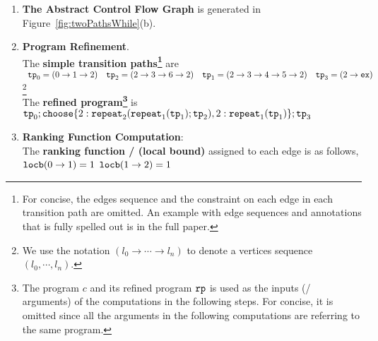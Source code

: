 \begin{enumerate}
  \item  \textbf{The Abstract Control Flow Graph} is generated in Figure~\ref{fig:twoPathsWhile}(b).

  \item \textbf{Program Refinement}. 
  \\
  The \textbf{simple transition paths\footnote{For concise, the edges sequence and the constraint on each edge in
  each transition path are omitted.
  An example with edge sequences and annotations that is fully spelled out is in the full paper.}} are
  \\
$
\begin{array}{llll}
  \mathtt{tp}_0 = (0 \to 1 \to 2)
  &
  \mathtt{tp}_2 = (2 \to 3 \to 6 \to 2)
  &
  \mathtt{tp}_1 = (2 \to 3 \to 4 \to 5 \to 2)
  &
  \mathtt{tp}_3 = (2 \to \mathtt{ex})
  \end{array}
$\footnote{We use the notation $(l_0 \to \cdots \to l_n)$ to denote a vertices sequence $(l_0, \cdots, l_n)$.}
\\
The \textbf{refined program\footnote{The program $c$ and its refined program $\mathtt{rp}$ is used as the inputs (/ arguments) of the computations in the following steps.
For concise, it is omitted since all the arguments in the following computations are referring to the same program.}} is
\\
$
  \tpath_0 ; \rpchoose{2: \rprepeat_2(\rprepeat_1(\tpath_1); \tpath_2) , 
  2: \rprepeat_1(\tpath_1) }; \tpath_3
$
\item \textbf{Ranking Function Computation}:
\\
  The \textbf{ranking function / (local bound)}  assigned to each edge is as follows,
    \\  
      $\mathtt{locb}(0 \to 1) = 1$ 
      \quad
      $\mathtt{locb}(1 \to 2) = 1$ 
      \quad

\end{enumerate}
